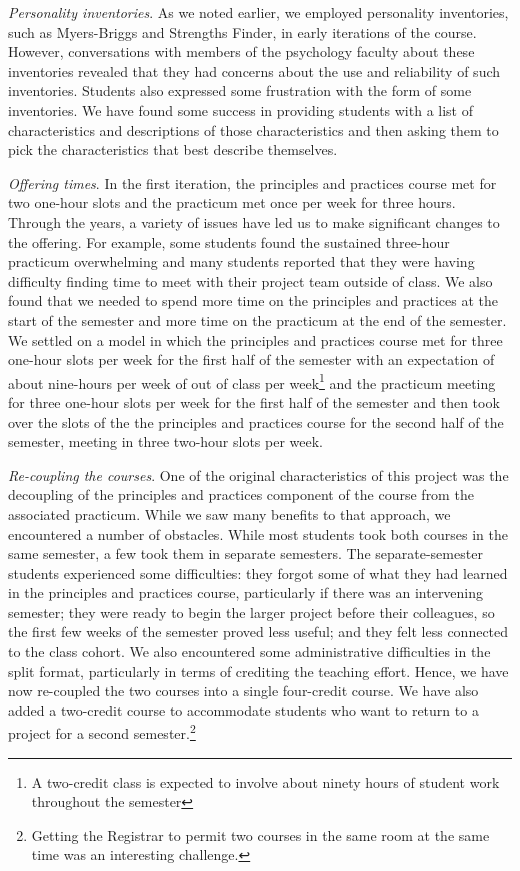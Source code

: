 \textit{Personality inventories}.  As we noted earlier, we employed
personality inventories, such as Myers-Briggs and Strengths Finder,
in early iterations of the course.  However, conversations with
members of the psychology faculty about these inventories revealed
that they had concerns about the use and reliability of such
inventories.  Students also expressed some frustration with the
form of some inventories.  We have found some success in providing
students with a list of characteristics and descriptions of those
characteristics and then asking them to pick the characteristics that
best describe themselves.

\textit{Offering times}.  In the first iteration, the principles
and practices course met for two one-hour slots and the practicum
met once per week for three hours.  Through the years, a variety
of issues have led us to make significant changes to the offering.
For example, some students found the sustained three-hour practicum
overwhelming and many students reported that they were having
difficulty finding time to meet with their project team outside of
class.  We also found that we needed to spend more time on the
principles and practices at the start of the semester and more time
on the practicum at the end of the semester.  We settled on a model
in which the principles and practices course met for three one-hour
slots per week for the first half of the semester with an expectation
of about nine-hours per week of out of class per week\footnote{A
two-credit class is expected to involve about ninety hours of student
work throughout the semester} and the practicum meeting for three
one-hour slots per week for the first half of the semester and then
took over the slots of the the principles and practices course for
the second half of the semester, meeting in three two-hour slots
per week.

\textit{Re-coupling the courses}.  One of the original characteristics
of this project was the decoupling of the principles and practices component
of the course from the associated practicum.  While we saw many
benefits to that approach, we encountered a number of obstacles.
While most students took both courses in the same semester, a few
took them in separate semesters.  The separate-semester students
experienced some difficulties: they forgot some of what they had
learned in the principles and practices course, particularly if
there was an intervening semester; they were ready to begin the
larger project before their colleagues, so the first few weeks of
the semester proved less useful; and they felt less connected to
the class cohort.  We also encountered some administrative difficulties
in the split format, particularly in terms of crediting the teaching
effort.  Hence, we have now re-coupled the two courses into a single
four-credit course.  We have also added a two-credit course to accommodate 
students who want to return to a project for a second 
semester.\footnote{Getting the Registrar to permit two courses in the same
room at the same time was an interesting challenge.}  

